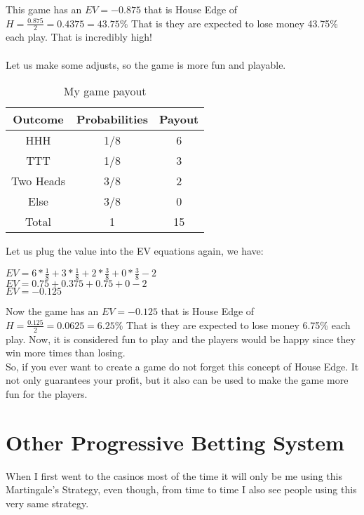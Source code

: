 \documentclass{article}
\begin{document}
This game has an $EV=-0.875$ that is House Edge of $H=\frac{0.875}{2}=0.4375=43.75\%$ That is they are expected to lose money 43.75\% each play. That is incredibly high!\\
\\
Let us make some adjusts, so the game is more fun and playable.\\

\begin{table}[hbt]
\centering
\begin{tabular}{|c|c|c|}
\hline
Outcome & Probabilities & Payout \\
\hline
HHH & 1/8 & 6\\
TTT & 1/8 & 3\\
Two Heads & 3/8 & 2\\
Else & 3/8 & 0\\
\hline
Total& 1 & 15\\
\hline
\end{tabular}
\caption{My game payout}
\end{table}
Let us plug the value into the EV equations again,  we have: \\
\begin{center}
$EV = 6*\frac{1}{8}+ 3*\frac{1}{8}+ 2*\frac{3}{8}+0*\frac{3}{8}-2$\\
$EV = 0.75+ 0.375+ 0.75+0-2$\\
$EV = -0.125$\\
\end{center}

Now the game has an $EV=-0.125$ that is House Edge of $H=\frac{0.125}{2}=0.0625=6.25\%$ That is they are expected to lose money 6.75\% each play. Now, it is considered fun to play and the players would be happy since they win more times than losing.\\

So, if you ever want to create a game do not forget this concept of House Edge.  It not only guarantees your profit, but it also can be used to make the game more fun for the players.\\

\clearpage
\section{Other Progressive Betting System}
When I first went to the casinos most of the time it will only be me using this Martingale's Strategy, even though, from time to time I also see people using this very same strategy.  \\
\end{document}
